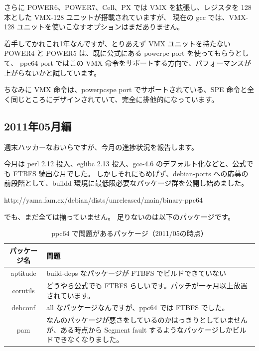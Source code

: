 \documentclass[mingoth,a4paper]{jsarticle}
\begin{document}
さらに POWER6、POWER7、Cell、PX では VMX を拡張し、レジスタを 128 本とした VMX-128 ユニットが搭載されていますが、
現在の gcc では、VMX-128 ユニットを使いこなすオプションはまだありません。

着手してかれこれ1年なんですが、とりあえず VMX ユニットを持たない POWER4 と POWER5 は、既に公式にある powerpc port を使ってもらうとして、
ppc64 port ではこの VMX 命令をサポートする方向で、パフォーマンスが上がらないかと試しています。

ちなみに VMX 命令は、powerpcspe port でサポートされている、SPE 命令と全く同じところにデザインされていて、完全に排他的になっています。

\subsection{2011年05月編}

週末ハッカーなおいらですが、今月の進捗状況を報告します。

今月は perl 2.12 投入、eglibc 2.13 投入、gcc-4.6 のデフォルト化などと、公式でも FTBFS 続出な月でした。
しかしそれにもめげず、debian-ports への応募の前段階として、buildd 環境に最低限必要なパッケージ群を公開し始めました。

\begin{commandline}
http://yama.fam.cx/debian/dists/unreleased/main/binary-ppc64
\end{commandline}

でも、まだ全ては揃っていません。
足りないのは以下のパッケージです。






\begin{table}[h]
 \caption{ppc64 で問題があるパッケージ（2011/05の時点）}
 \label{tab:ppc64-ftbfs}
 \begin{center}
\begin{tabular}{|c|p{30em}|}
 \hline
 パッケージ名 & 問題 \\
 \hline \hline
   aptitude & build-deps なパッケージが FTBFS でビルドできていない \\
   corutils & どうやら公式でも FTBFS らしいです。パッチが一ヶ月以上放置されています。 \\
   debconf & all なパッケージなんですが、ppc64 では FTBFS でした。 \\
   pam & なんのパッケージが悪さをしているのかはっきりとしていませんが、ある時点から Segment fault するようなパッケージしかビルドできなくなりました。 \\
 \hline
 \end{tabular}
\end{center}
\end{table}
\end{document}
